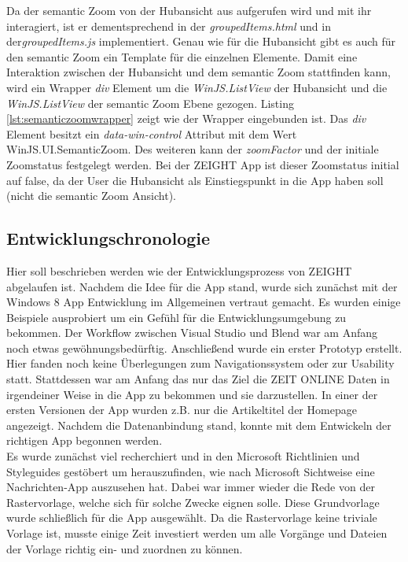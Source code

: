 \documentclass[12pt,a4paper,bibtotoc,abstracton]{scrartcl}
\begin{document}
Da der semantic Zoom von der Hubansicht aus aufgerufen wird und mit ihr interagiert, ist er dementsprechend in der \textit{groupedItems.html} und in der\textit{groupedItems.js} implementiert. Genau wie für die Hubansicht gibt es auch für den semantic Zoom ein Template für die einzelnen Elemente. Damit eine Interaktion zwischen der Hubansicht und dem semantic Zoom stattfinden kann, wird ein Wrapper \textit{div} Element um die \textit{WinJS.ListView} der Hubansicht und die \textit{WinJS.ListView} der semantic Zoom Ebene gezogen. Listing \ref{lst:semanticzoomwrapper} zeigt wie der Wrapper eingebunden ist. Das \textit{div} Element besitzt ein \textit{data-win-control} Attribut mit dem Wert \glqq WinJS.UI.SemanticZoom\grqq. Des weiteren kann der \textit{zoomFactor} und der initiale Zoomstatus festgelegt werden. Bei der ZEIGHT App ist dieser Zoomstatus initial auf false, da der User die Hubansicht als Einstiegspunkt in die App haben soll (nicht die semantic Zoom Ansicht).

\begin{minipage}{\linewidth}
  
\end{minipage}

\subsection{Entwicklungschronologie}
\label{subsec:entwicklungschronologie}
Hier soll beschrieben werden wie der Entwicklungsprozess von ZEIGHT abgelaufen ist. Nachdem die Idee für die App stand, wurde sich zunächst mit der Windows 8 App Entwicklung im Allgemeinen vertraut gemacht. Es wurden einige Beispiele ausprobiert um ein Gefühl für die Entwicklungsumgebung zu bekommen. Der Workflow zwischen Visual Studio und Blend war am Anfang noch etwas gewöhnungsbedürftig. Anschließend wurde ein erster Prototyp erstellt. Hier fanden noch keine Überlegungen zum Navigationssystem oder zur Usability  statt. Stattdessen war am Anfang das nur das Ziel die ZEIT ONLINE Daten in irgendeiner Weise in die App zu bekommen und sie darzustellen. In einer der ersten Versionen der App wurden z.B. nur die Artikeltitel der Homepage angezeigt. Nachdem die Datenanbindung stand, konnte mit dem Entwickeln der richtigen App begonnen werden.\\

Es wurde zunächst viel recherchiert und in den Microsoft Richtlinien und Styleguides gestöbert um herauszufinden, wie nach Microsoft Sichtweise eine Nachrichten-App auszusehen hat. Dabei war immer wieder die Rede von der Rastervorlage, welche sich für solche Zwecke eignen solle. Diese Grundvorlage wurde schließlich für die App ausgewählt. Da die Rastervorlage keine triviale Vorlage ist, musste einige Zeit investiert werden um alle Vorgänge und Dateien der Vorlage richtig ein- und zuordnen zu können. \\
\end{document}

